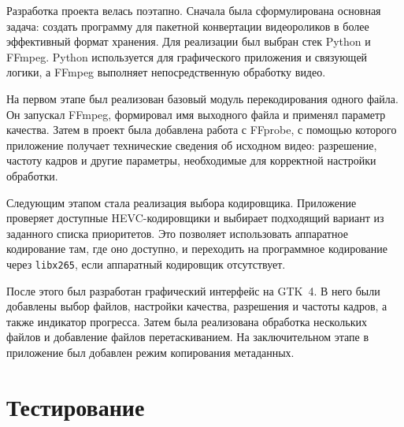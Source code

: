 \documentclass[14pt,a4paper]{extarticle}
\begin{document}
Разработка проекта велась поэтапно. Сначала была сформулирована основная задача: создать программу для пакетной конвертации видеороликов в более эффективный формат хранения. Для реализации был выбран стек Python и FFmpeg. Python используется для графического приложения и связующей логики, а FFmpeg выполняет непосредственную обработку видео.

На первом этапе был реализован базовый модуль перекодирования одного файла. Он запускал FFmpeg, формировал имя выходного файла и применял параметр качества. Затем в проект была добавлена работа с FFprobe, с помощью которого приложение получает технические сведения об исходном видео: разрешение, частоту кадров и другие параметры, необходимые для корректной настройки обработки.

Следующим этапом стала реализация выбора кодировщика. Приложение проверяет доступные HEVC-кодировщики и выбирает подходящий вариант из заданного списка приоритетов. Это позволяет использовать аппаратное кодирование там, где оно доступно, и переходить на программное кодирование через \texttt{libx265}, если аппаратный кодировщик отсутствует.

После этого был разработан графический интерфейс на GTK~4. В него были добавлены выбор файлов, настройки качества, разрешения и частоты кадров, а также индикатор прогресса. Затем была реализована обработка нескольких файлов и добавление файлов перетаскиванием. На заключительном этапе в приложение был добавлен режим копирования метаданных.

\section{Тестирование}
\end{document}
